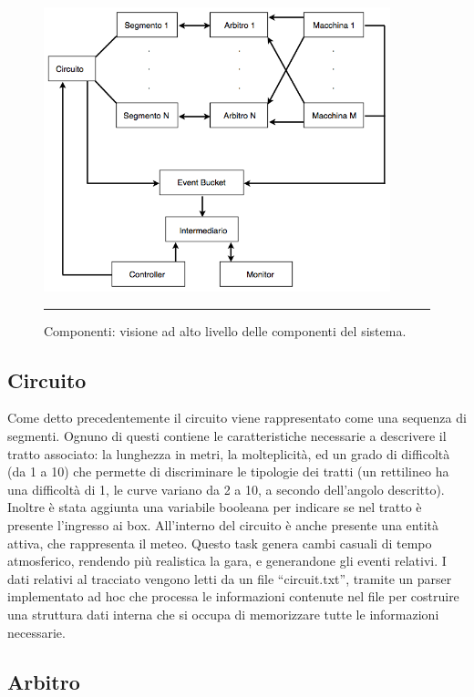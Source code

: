 \begin{figure}[htbp]
	\centering
		\includegraphics[keepaspectratio = true, width = 380px] {Pictures/schema}
		\rule{35em}{0.5pt}
	\caption[Componenti]{Componenti: visione ad alto livello delle componenti del sistema.}
	\label{fig:Componenti}
\end{figure}

\subsection{Circuito}

Come detto precedentemente il circuito viene rappresentato come una sequenza di segmenti. Ognuno di questi contiene le caratteristiche necessarie a descrivere il tratto associato: la lunghezza in metri, la molteplicità, ed un grado di difficoltà (da 1 a 10) che permette di discriminare le tipologie dei tratti (un rettilineo ha una difficoltà di 1, le curve variano da 2 a 10, a secondo dell’angolo descritto). Inoltre è stata aggiunta una variabile booleana per indicare se nel tratto è presente l’ingresso ai box.
All’interno del circuito è anche presente una entità attiva, che rappresenta il meteo. Questo task genera cambi casuali di tempo atmosferico, rendendo più realistica la gara, e generandone gli eventi relativi.
I dati relativi al tracciato vengono letti da un file “circuit.txt”, tramite un parser implementato ad hoc che processa le informazioni contenute nel file per costruire una struttura dati interna che si occupa di memorizzare tutte le informazioni necessarie.

\subsection{Arbitro}

